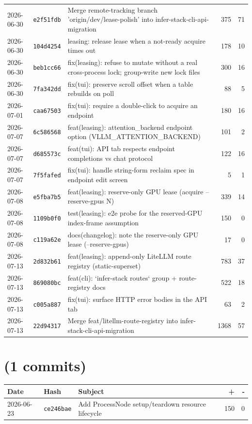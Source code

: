 \begin{longtable}{@{}p{}p{}p{}r r@{}}
2026-06-30 & \texttt{e2f51fdb} & Merge remote-tracking branch 'origin/dev/lease-polish' into infer-stack-cli-api-migration & 375 & 71 \\
2026-06-30 & \texttt{104d4254} & leasing: release lease when a not-ready acquire times out & 178 & 10 \\
2026-06-30 & \texttt{beb1cc66} & fix(leasing): refuse to mutate without a real cross-process lock; group-write new lock files & 300 & 16 \\
2026-06-30 & \texttt{7fa342dd} & fix(tui): preserve scroll offset when a table rebuilds on poll & 88 & 5 \\
2026-07-01 & \texttt{caa67503} & fix(tui): require a double-click to acquire an endpoint & 180 & 16 \\
2026-07-07 & \texttt{6c586568} & feat(leasing): attention\_backend endpoint option (VLLM\_ATTENTION\_BACKEND) & 101 & 2 \\
2026-07-07 & \texttt{d685573c} & feat(tui): API tab respects endpoint completions vs chat protocol & 122 & 16 \\
2026-07-07 & \texttt{7f5fafed} & fix(tui): handle string-form reclaim spec in endpoint edit screen & 5 & 1 \\
2026-07-08 & \texttt{e5fba7b5} & feat(leasing): reserve-only GPU lease (acquire --reserve-gpus N) & 339 & 14 \\
2026-07-08 & \texttt{1109b0f0} & test(leasing): e2e probe for the reserved-GPU index-frame assumption & 150 & 0 \\
2026-07-08 & \texttt{c119a62e} & docs(changelog): note the reserve-only GPU lease (--reserve-gpus) & 17 & 0 \\
2026-07-13 & \texttt{2d832b61} & feat(leasing): append-only LiteLLM route registry (static-superset) & 783 & 37 \\
2026-07-13 & \texttt{869080bc} & feat(cli): `infer-stack routes` group + route-registry docs & 522 & 18 \\
2026-07-13 & \texttt{c005a887} & fix(tui): surface HTTP error bodies in the API tab & 63 & 2 \\
2026-07-13 & \texttt{22d94317} & Merge feat/litellm-route-registry into infer-stack-cli-api-migration & 1368 & 57 \\
\bottomrule\end{longtable}
\section*{ (1 commits)}
\begin{longtable}{@{}p{}p{}p{}r r@{}}
\toprule Date & Hash & Subject & + & - \\ \midrule\endhead
2026-06-23 & \texttt{ce246bae} & Add ProcessNode setup/teardown resource lifecycle & 150 & 0 \\
\bottomrule\end{longtable}
\normalsize